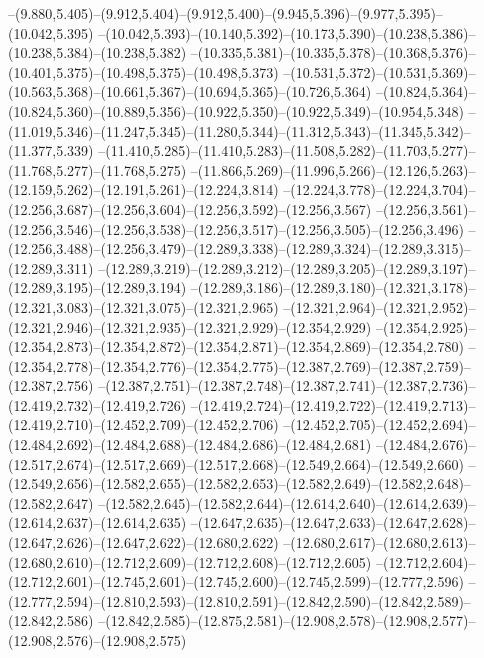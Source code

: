   --(9.880,5.405)--(9.912,5.404)--(9.912,5.400)--(9.945,5.396)--(9.977,5.395)--(10.042,5.395)%
  --(10.042,5.393)--(10.140,5.392)--(10.173,5.390)--(10.238,5.386)--(10.238,5.384)--(10.238,5.382)%
  --(10.335,5.381)--(10.335,5.378)--(10.368,5.376)--(10.401,5.375)--(10.498,5.375)--(10.498,5.373)%
  --(10.531,5.372)--(10.531,5.369)--(10.563,5.368)--(10.661,5.367)--(10.694,5.365)--(10.726,5.364)%
  --(10.824,5.364)--(10.824,5.360)--(10.889,5.356)--(10.922,5.350)--(10.922,5.349)--(10.954,5.348)%
  --(11.019,5.346)--(11.247,5.345)--(11.280,5.344)--(11.312,5.343)--(11.345,5.342)--(11.377,5.339)%
  --(11.410,5.285)--(11.410,5.283)--(11.508,5.282)--(11.703,5.277)--(11.768,5.277)--(11.768,5.275)%
  --(11.866,5.269)--(11.996,5.266)--(12.126,5.263)--(12.159,5.262)--(12.191,5.261)--(12.224,3.814)%
  --(12.224,3.778)--(12.224,3.704)--(12.256,3.687)--(12.256,3.604)--(12.256,3.592)--(12.256,3.567)%
  --(12.256,3.561)--(12.256,3.546)--(12.256,3.538)--(12.256,3.517)--(12.256,3.505)--(12.256,3.496)%
  --(12.256,3.488)--(12.256,3.479)--(12.289,3.338)--(12.289,3.324)--(12.289,3.315)--(12.289,3.311)%
  --(12.289,3.219)--(12.289,3.212)--(12.289,3.205)--(12.289,3.197)--(12.289,3.195)--(12.289,3.194)%
  --(12.289,3.186)--(12.289,3.180)--(12.321,3.178)--(12.321,3.083)--(12.321,3.075)--(12.321,2.965)%
  --(12.321,2.964)--(12.321,2.952)--(12.321,2.946)--(12.321,2.935)--(12.321,2.929)--(12.354,2.929)%
  --(12.354,2.925)--(12.354,2.873)--(12.354,2.872)--(12.354,2.871)--(12.354,2.869)--(12.354,2.780)%
  --(12.354,2.778)--(12.354,2.776)--(12.354,2.775)--(12.387,2.769)--(12.387,2.759)--(12.387,2.756)%
  --(12.387,2.751)--(12.387,2.748)--(12.387,2.741)--(12.387,2.736)--(12.419,2.732)--(12.419,2.726)%
  --(12.419,2.724)--(12.419,2.722)--(12.419,2.713)--(12.419,2.710)--(12.452,2.709)--(12.452,2.706)%
  --(12.452,2.705)--(12.452,2.694)--(12.484,2.692)--(12.484,2.688)--(12.484,2.686)--(12.484,2.681)%
  --(12.484,2.676)--(12.517,2.674)--(12.517,2.669)--(12.517,2.668)--(12.549,2.664)--(12.549,2.660)%
  --(12.549,2.656)--(12.582,2.655)--(12.582,2.653)--(12.582,2.649)--(12.582,2.648)--(12.582,2.647)%
  --(12.582,2.645)--(12.582,2.644)--(12.614,2.640)--(12.614,2.639)--(12.614,2.637)--(12.614,2.635)%
  --(12.647,2.635)--(12.647,2.633)--(12.647,2.628)--(12.647,2.626)--(12.647,2.622)--(12.680,2.622)%
  --(12.680,2.617)--(12.680,2.613)--(12.680,2.610)--(12.712,2.609)--(12.712,2.608)--(12.712,2.605)%
  --(12.712,2.604)--(12.712,2.601)--(12.745,2.601)--(12.745,2.600)--(12.745,2.599)--(12.777,2.596)%
  --(12.777,2.594)--(12.810,2.593)--(12.810,2.591)--(12.842,2.590)--(12.842,2.589)--(12.842,2.586)%
  --(12.842,2.585)--(12.875,2.581)--(12.908,2.578)--(12.908,2.577)--(12.908,2.576)--(12.908,2.575)%
